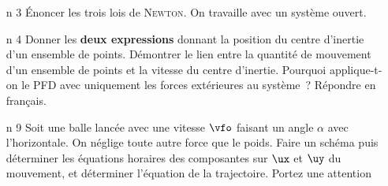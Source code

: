 \documentclass[a4paper, 10pt, final, garamond]{book}
\begin{document}
\begin{enumerate}[label=\sqenumi]
\begin{minipage}{.39\linewidth}
\begin{center}
{			      }
		      \end{center}
	      \end{minipage}
	      \vspace{-15pt}
	\item[n]{3}%
	      Énoncer les trois lois de \textsc{Newton}. On travaille avec un système
	      ouvert.
	      \smallbreak
	      \vspace{-15pt}
	\item[n]{4}%
	      Donner les \textbf{deux expressions} donnant la position du centre
	      d'inertie d'un ensemble de points. Démontrer le lien entre la quantité de
	      mouvement d'un ensemble de points et la vitesse du centre d'inertie. Pourquoi
	      applique-t-on le PFD avec uniquement les forces extérieures au système~?
	      Répondre en français.
	      \smallbreak
	\item[n]{9}%
	      Soit une balle lancée avec une vitesse $\vfo$ faisant un angle $\alpha$ avec
	      l'horizontale. On néglige toute autre force que le poids. Faire un schéma puis
	      déterminer les équations horaires des composantes sur $\ux$ et $\uy$ du
	      mouvement, et déterminer l'équation de la trajectoire. Portez une attention

\end{enumerate}
\end{document}
